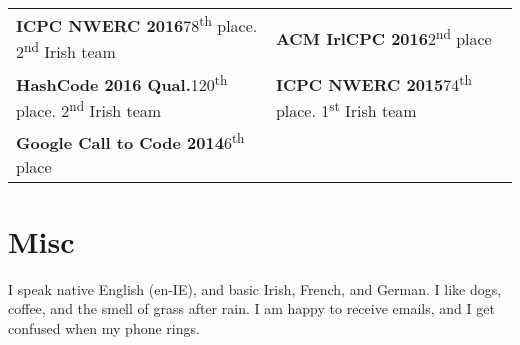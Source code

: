 \documentclass[a4paper, oneside, final]{scrartcl}
\newcommand{\fmtcompetition}[1]{\textbf{\small{#1}}}
\begin{document}
\begin{tabularx}{\columnwidth}{@{}X|X@{}}
\fmtcompetition{ICPC NWERC 2016}\hfill 78\textsuperscript{th} place. 2\textsuperscript{nd} Irish team&
\fmtcompetition{ACM IrlCPC 2016}\hfill 2\textsuperscript{nd} place\\ %
\fmtcompetition{HashCode 2016 Qual.}\hfill 120\textsuperscript{th} place. 2\textsuperscript{nd} Irish team&
\fmtcompetition{ICPC NWERC 2015}\hfill 74\textsuperscript{th} place. 1\textsuperscript{st} Irish team\\ %
\fmtcompetition{Google Call to Code 2014}\hfill 6\textsuperscript{th} place\\%
\end{tabularx}
\normalsize{}
\section{Misc}
I speak native English (en-IE), and basic Irish, French, and German. I like dogs, coffee, and the smell of grass after rain. I am happy to receive emails, and I get confused when my phone rings.
\end{document}
